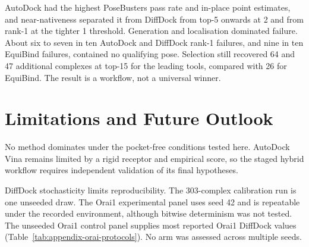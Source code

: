 AutoDock had the highest PoseBusters pass rate and in-place point estimates, and near-nativeness separated it from DiffDock from top-5 onwards at 2\angstrom{} and from rank-1 at the tighter 1\angstrom{} threshold. Generation and localisation dominated failure. About six to seven in ten AutoDock and DiffDock rank-1 failures, and nine in ten EquiBind failures, contained no qualifying pose. Selection still recovered 64 and 47 additional complexes at top-15 for the leading tools, compared with 26 for EquiBind. The result is a workflow, not a universal winner.

\hypertarget{limitations-and-future-outlook}{%
\chapter{Limitations and Future Outlook}\label{limitations-and-future-outlook}}

No method dominates under the pocket-free conditions tested here. AutoDock Vina remains limited by a rigid receptor and empirical score, so the staged hybrid workflow requires independent validation of its final hypotheses.

DiffDock stochasticity limits reproducibility. The 303-complex calibration run is one unseeded draw. The Orai1 experimental panel uses seed 42 and is repeatable under the recorded environment, although bitwise determinism was not tested. The unseeded Orai1 control panel supplies most reported Orai1 DiffDock values (Table~\ref{tab:appendix-orai-protocols}). No arm was assessed across multiple seeds.

